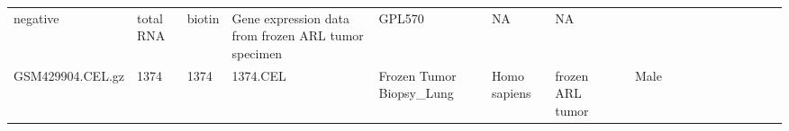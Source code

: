 \documentclass[]{article}
\begin{document}
\begin{longtable}[]{@{}lllllllrllllllllll@{}}
\begin{minipage}[t]{0.04\columnwidth}
negative\strut
\end{minipage} & \begin{minipage}[t]{0.02\columnwidth}\raggedright
total RNA\strut
\end{minipage} & \begin{minipage}[t]{0.01\columnwidth}\raggedright
biotin\strut
\end{minipage} & \begin{minipage}[t]{0.08\columnwidth}\raggedright
Gene expression data from frozen ARL tumor specimen\strut
\end{minipage} & \begin{minipage}[t]{0.01\columnwidth}\raggedright
GPL570\strut
\end{minipage} & \begin{minipage}[t]{0.00\columnwidth}\raggedright
NA\strut
\end{minipage} & \begin{minipage}[t]{0.01\columnwidth}\raggedright
NA\strut
\end{minipage}\tabularnewline
\begin{minipage}[t]{0.03\columnwidth}\raggedright
GSM429904.CEL.gz\strut
\end{minipage} & \begin{minipage}[t]{0.02\columnwidth}\raggedright
1374\strut
\end{minipage} & \begin{minipage}[t]{0.01\columnwidth}\raggedright
1374\strut
\end{minipage} & \begin{minipage}[t]{0.02\columnwidth}\raggedright
1374.CEL\strut
\end{minipage} & \begin{minipage}[t]{0.06\columnwidth}\raggedright
Frozen Tumor Biopsy\_Lung\strut
\end{minipage} & \begin{minipage}[t]{0.02\columnwidth}\raggedright
Homo sapiens\strut
\end{minipage} & \begin{minipage}[t]{0.04\columnwidth}\raggedright
frozen ARL tumor\strut
\end{minipage} & \begin{minipage}[t]{0.05\columnwidth}\raggedleft
33\strut
\end{minipage} & \begin{minipage}[t]{0.04\columnwidth}\raggedright
Male\strut
\end{minipage} & \begin{minipage}[t]{0.06\columnwidth}\raggedright

\end{minipage}
\end{longtable}
\end{document}
